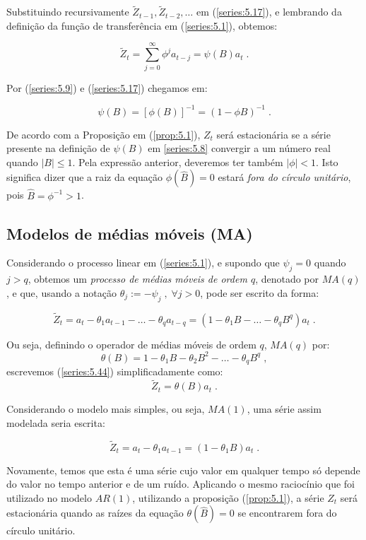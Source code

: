 Substituindo recursivamente $\tilde{Z}_{t-1}, \tilde{Z}_{t-2}, \ldots$ em (\ref{series:5.17}), e lembrando da definição da função de transferência em (\ref{series:5.1}), obtemos:

\[
\tilde{Z}_t = \sum_{j=0}^\infty \phi^j a_{t-j} = \psi(B)a_t\;.
\]

Por (\ref{series:5.9}) e (\ref{series:5.17}) chegamos em:

\[
\psi(B) = [\phi(B)]^{-1} = (1 - \phi B)^{-1}\;.
\]

De acordo com a Proposição em (\ref{prop:5.1}), $Z_t$ será estacionária se a série presente na definição de $\psi(B)$ em \eqref{series:5.8} convergir a um número real quando $|B| \leq 1$. Pela expressão anterior, deveremos ter também $|\phi| < 1$. Isto significa dizer que a raiz da equação $\phi(\hat{B}) = 0$ estará \emph{fora do círculo unitário}, pois $\hat{B} = \phi^{-1} > 1$.


\subsection{Modelos de médias móveis (MA)}

Considerando o processo linear em (\ref{series:5.1}), e supondo que $\psi_j = 0$ quando $j > q$, obtemos um \emph{processo de médias móveis de ordem $q$}, denotado por $MA(q)$, e que, usando a notação $\theta_j := -\psi_j\;, \; \forall j>0$, pode ser escrito da forma:

\begin{equation}\label{series:5.44}
\tilde{Z}_t = a_t - \theta_1 a_{t-1} - \ldots - \theta_q a_{t-q} = (1 - \theta_1 B - \ldots - \theta_q B^q)a_t\;.
\end{equation}

Ou seja, definindo o operador de médias móveis de ordem $q$, $MA(q)$ por:
\[
\theta(B) = 1 - \theta_1 B - \theta_2 B^2 - \ldots - \theta_q B^q\;,
\]
escrevemos (\ref{series:5.44}) simplificadamente como:
\begin{equation}\label{series:5.45}
\tilde{Z}_t = \theta(B) a_t\;.
\end{equation}

Considerando o modelo mais simples, ou seja, $MA(1)$, uma série assim modelada seria escrita:

\[
\tilde{Z}_t = a_t - \theta_1 a_{t-1} = (1 - \theta_1 B)a_t\;.
\]

Novamente, temos que esta é uma série cujo valor em qualquer tempo só depende do valor no tempo anterior e de um ruído. Aplicando o mesmo raciocínio que foi utilizado no modelo $AR(1)$, utilizando a proposição (\ref{prop:5.1}), a série $Z_t$ será estacionária quando as raízes da equação $\theta(\hat{B}) = 0$ se encontrarem fora do círculo unitário.


